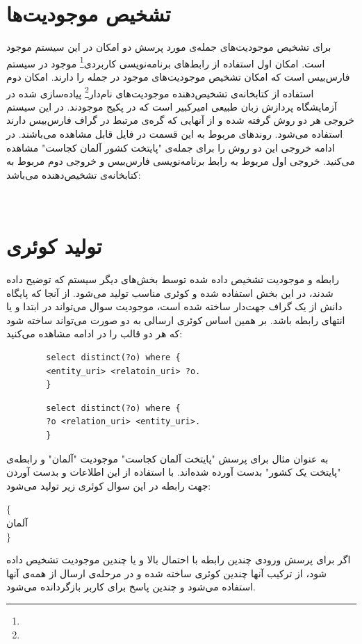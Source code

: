 \section{تشخیص موجودیت‌ها}
برای تشخیص موجودیت‌های جمله‌ی مورد پرسش دو امکان در این سیستم موجود است. امکان اول استفاده از رابط‌های برنامه‌نویسی کاربردی\footnote{} موجود در سیستم فارس‌بیس است که امکان تشخیص موجودیت‌های موجود در جمله را دارند. امکان دوم استفاده از کتابخانه‌ی تشخیص‌دهنده موجودیت‌های نام‌دار\footnote{} پیاده‌سازی شده در آزمایشگاه پردازش زبان طبیعی امیرکبیر است که در پکیج  موجودند. 
در این سیستم خروجی هر دو روش گرفته شده و از آنهایی که گره‌ی مرتبط در گراف فارس‌بیس دارند استفاده می‌شود. روندهای مربوط به این قسمت در فایل  قابل مشاهده می‌باشند.
در ادامه خروجی این دو روش را برای جمله‌ی "پایتخت کشور آلمان کجاست" مشاهده می‌کنید. خروجی اول مربوط به رابط برنامه‌نویسی فارس‌بیس و خروجی دوم مربوط به کتابخانه‌ی تشخیص‌دهنده می‌باشد:
\begin{flushleft}
\\
\end{flushleft}
\section{تولید کوئری}
رابطه و موجودیت‌ تشخیص داده شده توسط بخش‌های دیگر سیستم که توضیح داده شدند، در این بخش استفاده شده و کوئری مناسب تولید می‌شود. از آنجا که پایگاه دانش از یک گراف جهت‌دار ساخته شده است، موجودیت سوال می‌تواند در ابتدا و یا انتهای رابطه باشد. بر همین اساس کوئری ارسالی به دو صورت می‌تواند ساخته شود که هر دو قالب را در ادامه مشاهده می‌کنید:

\begin{multicols}{2}
	\begin{LTR}
		\begin{verbatim}
		select distinct(?o) where {
		<‌entity_uri> <relatoin_uri> ?o.
		}
		\end{verbatim}
	\end{LTR}
	\columnbreak
	
	\begin{LTR}
		\begin{verbatim}
		select distinct(?o) where {
		?o <relation_uri> <entity_uri>.
		}
		\end{verbatim}
	\end{LTR}
\end{multicols}
به عنوان مثال برای پرسش "پایتخت آلمان کجاست" موجودیت "آلمان" و رابطه‌ی "پایتخت یک کشور" بدست آورده شده‌اند. با استفاده از این اطلاعات و بدست آوردن جهت رابطه در این سوال کوئری زیر تولید می‌شود:
\begin{LTR}
	\noindent {}$\{$
	\\آلمان\lr{>}
	\\$\}$
\end{LTR}
اگر برای پرسش ورودی چندین رابطه با احتمال بالا و یا چندین موجودیت تشخیص داده شود، از ترکیب آنها چندین کوئری ساخته شده و در مرحله‌ی ارسال از همه‌ی آنها استفاده می‌شود و چندین پاسخ برای کاربر بازگردانده می‌شود. 
